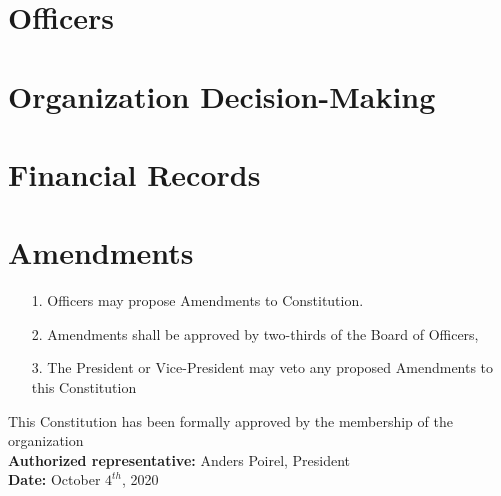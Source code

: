 \documentclass{article}
\begin{document}
\section{Officers}


\section{Organization Decision-Making}

\section{Financial Records}

\section{Amendments}

\begin{itemize}
    \item[1.] Officers may propose Amendments to Constitution. 
    \item[2.] Amendments shall be approved by two-thirds of the Board of Officers,
    \item[3.] The President or Vice-President may veto any proposed Amendments to this 
    Constitution 
\end{itemize}

\newpage

\begin{center}
    This Constitution has been formally approved by the membership of the organization \\
    \vspace{10pt}
    \textbf{Authorized representative:} Anders Poirel, President \\
    \vspace{10pt}
    \textbf{Date:} October $4^{th}$, 2020
\end{center}
\end{document}
